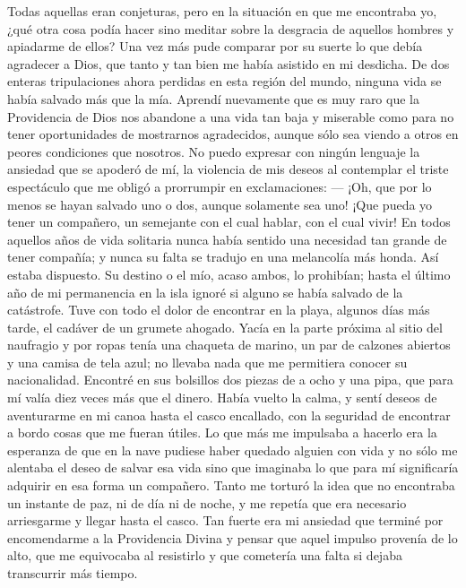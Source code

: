 \documentclass{novela}
\begin{document}
    Todas aquellas eran conjeturas, pero en la situación en que me encontraba yo, ¿qué otra cosa podía hacer sino meditar sobre la desgracia de aquellos hombres y apiadarme de ellos? Una vez más pude comparar por su suerte lo que debía agradecer a Dios, que tanto y tan bien me había asistido en mi desdicha. De dos enteras tripulaciones ahora perdidas en esta región del mundo, ninguna vida se había salvado más que la mía. Aprendí nuevamente que es muy raro que la Providencia de Dios nos abandone a una vida tan baja y miserable como para no tener oportunidades de mostrarnos agradecidos, aunque sólo sea viendo a otros en peores condiciones que nosotros.
    No puedo expresar con ningún lenguaje la ansiedad que se apoderó de mí, la violencia de mis deseos al contemplar el triste espectáculo que me obligó a prorrumpir en exclamaciones:
    — ¡Oh, que por lo menos se hayan salvado uno o dos, aunque solamente sea uno! ¡Que pueda yo tener un compañero, un semejante con el cual hablar, con el cual vivir!
    En todos aquellos años de vida solitaria nunca había sentido una necesidad tan grande de tener compañía; y nunca su falta se tradujo en una melancolía más honda.
    Así estaba dispuesto. Su destino o el mío, acaso ambos, lo prohibían; hasta el último año de mi permanencia en la isla ignoré si alguno se había salvado de la catástrofe. Tuve con todo el dolor de encontrar en la playa, algunos días más tarde, el cadáver de un grumete ahogado. Yacía en la parte próxima al sitio del naufragio y por ropas tenía una chaqueta de marino, un par de calzones abiertos y una camisa de tela azul; no llevaba nada que me permitiera conocer su nacionalidad. Encontré en sus bolsillos dos piezas de a ocho y una pipa, que para mí valía diez veces más que el dinero.
    Había vuelto la calma, y sentí deseos de aventurarme en mi canoa hasta el casco encallado, con la seguridad de encontrar a bordo cosas que me fueran útiles. Lo que más me impulsaba a hacerlo era la esperanza de que en la nave pudiese haber quedado alguien con vida y no sólo me alentaba el deseo de salvar esa vida sino que imaginaba lo que para mí significaría adquirir en esa forma un compañero. Tanto me torturó la idea que no encontraba un instante de paz, ni de día ni de noche, y me repetía que era necesario arriesgarme y llegar hasta el casco. Tan fuerte era mi ansiedad que terminé por encomendarme a la Providencia Divina y pensar que aquel impulso provenía de lo alto, que me equivocaba al resistirlo y que cometería una falta si dejaba transcurrir más tiempo.
\end{document}
